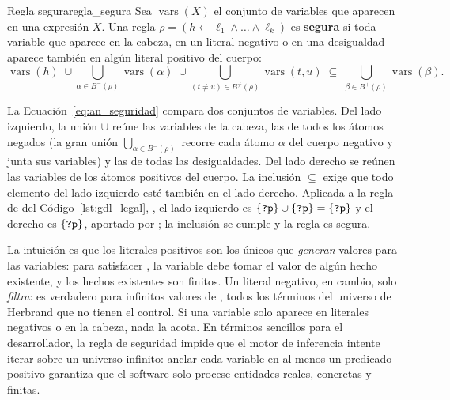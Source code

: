 \begin{definicion}{Regla segura}{regla_segura}
Sea $\operatorname{vars}(X)$ el conjunto de variables que aparecen en una expresión $X$. Una regla $\rho = (h \leftarrow \ell_1 \land \dots \land \ell_k)$ es \textbf{segura} si toda variable que aparece en la cabeza, en un literal negativo o en una desigualdad aparece también en algún literal positivo del cuerpo:
\begin{equation}
    \operatorname{vars}(h) \;\cup \bigcup_{\alpha \in B^-(\rho)} \operatorname{vars}(\alpha) \;\cup \bigcup_{(t \neq u) \in B^{\neq}(\rho)} \operatorname{vars}(t, u)
    \;\subseteq\; \bigcup_{\beta \in B^+(\rho)} \operatorname{vars}(\beta).
    \label{eq:an_seguridad}
\end{equation}
\end{definicion}

La Ecuación~\eqref{eq:an_seguridad} compara dos conjuntos de variables. Del lado izquierdo, la unión $\cup$ reúne las variables de la cabeza, las de todos los átomos negados (la gran unión $\bigcup_{\alpha \in B^-(\rho)}$ recorre cada átomo $\alpha$ del cuerpo negativo y junta sus variables) y las de todas las desigualdades. Del lado derecho se reúnen las variables de los átomos positivos del cuerpo. La inclusión $\subseteq$ exige que todo elemento del lado izquierdo esté también en el lado derecho. Aplicada a la regla de  del Código~\ref{lst:gdl_legal}, , el lado izquierdo es $\{\texttt{?p}\} \cup \{\texttt{?p}\} = \{\texttt{?p}\}$ y el derecho es $\{\texttt{?p}\}$, aportado por ; la inclusión se cumple y la regla es segura.

La intuición es que los literales positivos son los únicos que \emph{generan} valores para las variables: para satisfacer , la variable  debe tomar el valor de algún hecho existente, y los hechos existentes son finitos. Un literal negativo, en cambio, solo \emph{filtra}:  es verdadero para infinitos valores de , todos los términos del universo de Herbrand que no tienen el control. Si una variable solo aparece en literales negativos o en la cabeza, nada la acota. En términos sencillos para el desarrollador, la regla de seguridad impide que el motor de inferencia intente iterar sobre un universo infinito: anclar cada variable en al menos un predicado positivo garantiza que el software solo procese entidades reales, concretas y finitas.

